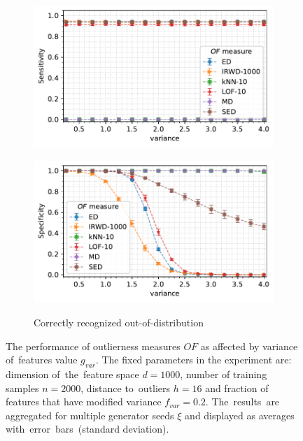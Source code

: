\begin{figure}[t]
\begin{subfigure}[b]{0.495\textwidth}
        \includegraphics[width=\textwidth]{images/variances/g_var/trend-variances-sens_95(variance)-n_varied_0.20-distance_16-outliers_varied_False-model_ED,IRWD-1000,kNN-10,LOF-10,MD,SED-aggregated.pdf}
        \label{fig:variance-sensitivity}
    \end{subfigure}
    \hfill
    \begin{subfigure}[b]{0.495\textwidth}
        \centering
        \caption{\small Correctly recognized out-of-distribution}
        \includegraphics[width=\textwidth]{images/variances/g_var/trend-variances-spec_95(variance)-n_varied_0.20-distance_16-outliers_varied_False-model_ED,IRWD-1000,kNN-10,LOF-10,MD,SED-aggregated.pdf}
        \label{fig:variance-specificity}
    \end{subfigure}
    \caption{The performance of outlierness measures $OF$ as affected by variance of~features value $g_{var}$. The fixed parameters in the experiment are: dimension of~the~feature space $d = 1000$, number of training samples $n = 2000$, distance to~outliers $h = 16$ and fraction of features that have modified variance $f_{var} = 0.2$. The~results~are aggregated for multiple generator seeds $\xi$ and displayed as averages with~error~bars~(standard deviation).}
    \label{fig:variance}
    \vspace{-2.3em}
\end{figure}

